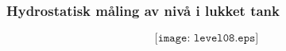 \documentclass[aspectratio=169,xcolor=dvipsnames]{beamer}
\begin{document}
%
%
%
%
%
\begin{frame}
	\frametitle{Hydrostatisk måling av nivå i lukket tank}

	$$\texttt{[image: level08.eps]}$$
\end{frame}
%
%
%
%
%
\end{document}
